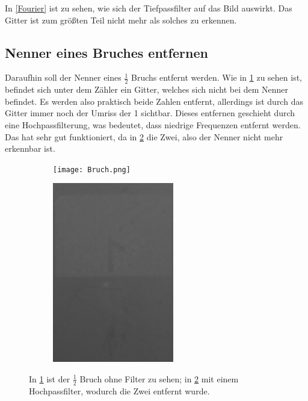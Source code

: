 In \cref{Fourier} ist zu sehen, wie sich der Tiefpassfilter auf das Bild auswirkt. Das Gitter ist zum größten Teil nicht mehr als solches zu erkennen.

\subsection{Nenner eines Bruches entfernen}
Daraufhin soll der Nenner eines $\frac{1}{2}$ Bruchs entfernt werden. Wie in \cref{fig:Bruch} zu sehen ist, befindet sich unter dem Zähler ein Gitter, welches sich nicht bei dem Nenner befindet. Es werden also praktisch beide Zahlen entfernt, allerdings ist durch das Gitter immer noch der Umriss der 1 sichtbar. Dieses entfernen geschieht durch eine Hochpassfilterung, was bedeutet, dass niedrige Frequenzen entfernt werden. Das hat sehr gut funktioniert, da in \cref{fig:Bruch_filter} die Zwei, also der Nenner nicht mehr erkennbar ist.

\begin{figure}[h]
	\begin{subfigure}[c]{0.5\textwidth}
		
		\texttt{[image: Bruch.png]}
		\caption{}
		\label{fig:Bruch}
		
	\end{subfigure}
	\begin{subfigure}[c]{0.5\textwidth}
		\includegraphics[width=0.58\textwidth]{Filter_Bruch.png}
		\caption{}
		\label{fig:Bruch_filter}
	\end{subfigure}
	\caption{In \cref{fig:Bruch} ist der $\frac{1}{2}$ Bruch ohne Filter zu sehen; in \cref{fig:Bruch_filter} mit einem Hochpassfilter, wodurch die Zwei entfernt wurde.}
	\label{Bruch}
\end{figure}   

